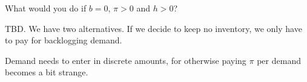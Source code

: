\begin{question}
\begin{solution}


  \end{solution}
\end{question}

\begin{question}
  What would you do if $b=0$, $\pi > 0$ and $h>0$? 
  \begin{solution}

TBD. 
    We have two alternatives. If we decide to keep no inventory, we
    only have to pay for backlogging demand. 

    Demand needs to enter in discrete amounts, for otherwise paying
    $\pi$ per demand becomes a bit strange.
  \end{solution}
\end{question}

